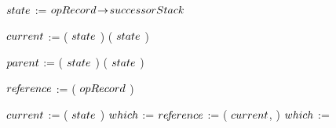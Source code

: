 \begin{limitscope}
{\begin{algorithm}[tb]
{   	
	 $state$ := $opRecord \!\rightarrow\! successorStack$\;
	 \While{\True}
	 {
	
	    \label{lin:local-seek|successor:while:begin}
			
	    
			{
			    \label{lin:local-seek|successor:while:backtrack:begin}
			    $\cNode$ := \GetTop( $state$ )\;
					\lIf{\LNot(\IsMarked( $\cNode$ ))}
					{
					   \Break
					} 
					\lElse
					{
					   \RemoveFromTop( $state$ )
					}
					\label{lin:local-seek|successor:while:backtrack:end}
			}
	
	    \BlankLine
			
			{
			   \label{lin:local-seek|successor:while:clean:begin}
			   \If{\NeedCleanParentNode( $\opRecord$, $\cNode$ )}
		     {
				    
				    $\pNode$ := \GetSecondToTop( $state$ )\;
				    \If{\LNot(\IsClean( $\pNode$ ))}
				    {
				       \RemoveFromTop( $state$ )\;
					     \Continue\;
							 \label{lin:local-seek|successor:while:clean:end}
				    }
			   }
				
			}
			
			\BlankLine
			
	    $re\!f\!erence$ := \NeedSuccessorKey( $\opRecord$ )\;
			\label{lin:local-seek|successor:while:need|successor}
			
			\BlankLine
			
			$\cNode$ := \GetTop( $state$ )\;
			{
			   \label{lin:local-seek|successor:while:traversal:if:begin}
			   $which$ := \RIGHT\;
				 \label{lin:local-seek|successor:while:traversal:if:end}
			}
			\Else
			{
			   \label{lin:local-seek|successor:while:traversal:else:begin}
		 	   $re\!f\!erence$ := \GetChild( $\cNode$, \LEFT{} )\;
			   $which$ := \LEFT\;
				 \label{lin:local-seek|successor:while:traversal:else:end}
			}
			
}}
\end{algorithm}}
\end{limitscope}
